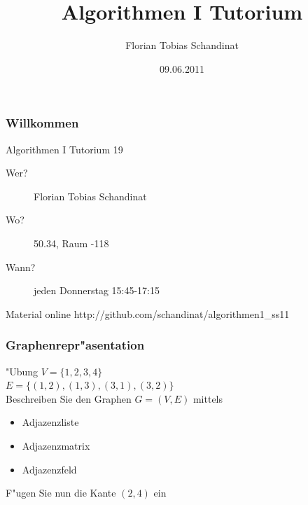 \documentclass{beamer}
\title{Algorithmen I Tutorium}
\author{Florian Tobias Schandinat}
\date{09.06.2011}
\institute{FTS}
\begin{document}
\begin{frame}
\frametitle{Willkommen}
\begin{block}{Algorithmen I Tutorium 19}
\begin{description}
\item[Wer?] Florian Tobias Schandinat\\
\item[Wo?] 50.34, Raum -118\\
\item[Wann?] jeden Donnerstag 15:45-17:15
\end{description}
\end{block}

\begin{block}{Material online}
http://github.com/schandinat/algorithmen1\_ss11
\end{block}
\end{frame}


\begin{frame}
\frametitle{Graphenrepr"asentation}
\begin{exampleblock}{"Ubung}
$V = \{1, 2, 3, 4\}$\\
$E = \{(1, 2), (1, 3), (3, 1), (3, 2)\}$\\

Beschreiben Sie den Graphen $G=(V,E)$ mittels
\begin{itemize}
\item Adjazenzliste
\item Adjazenzmatrix
\item Adjazenzfeld
\end{itemize}

\pause

F"ugen Sie nun die Kante $(2, 4)$ ein
\end{exampleblock}
\end{frame}
\end{document}
